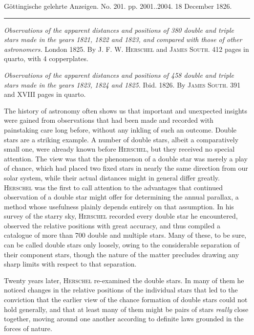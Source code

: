 \clearpage
{}
\hypertarget{native-647-lower}{}
\begin{center}\small Göttingische gelehrte Anzeigen. No. 201. pp. 2001..2004. 18 December 1826.\\[3pt]\rule{.72\linewidth}{.3pt}\end{center}

\emph{Observations of the apparent distances and positions of \textup{380} double and triple stars made in the years \textup{1821}, \textup{1822} and \textup{1823}, and compared with those of other astronomers.} London 1825. By \textsc{J. F. W. Herschel} and \textsc{James South}. 412 pages in quarto, with 4 copperplates.

\emph{Observations of the apparent distances and positions of \textup{458} double and triple stars made in the years \textup{1823}, \textup{1824} and \textup{1825}.} Ibid. 1826. By \textsc{James South}. 391 and XVIII pages in quarto.

The history of astronomy often shows us that important and unexpected insights were gained from observations that had been made and recorded with painstaking care long before, without any inkling of such an outcome. Double stars are a striking example. A number of double stars, albeit a comparatively small one, were already known before \textsc{Herschel}, but they received no special attention. The view was that the phenomenon of a double star was merely a play of chance, which had placed two fixed stars in nearly the same direction from our solar system, while their actual distances might in general differ greatly. \textsc{Herschel} was the first to call attention to the advantages that continued observation of a double star might offer for determining the annual parallax, a method whose usefulness plainly depends entirely on that assumption. In his survey of the starry sky, \textsc{Herschel} recorded every double star he encountered, observed the relative positions with great accuracy, and thus compiled a catalogue of more than 700 double and multiple stars. Many of these, to be sure, can be called double stars only loosely, owing to the considerable separation of their component stars, though the nature of the matter precludes drawing any sharp limits with respect to that separation.

Twenty years later, \textsc{Herschel} re-examined the double stars. In many of them he noticed changes in the relative positions of the individual stars that led to the conviction that the earlier view of the chance formation of double stars could not hold generally, and that at least many of them might be pairs of stars \emph{really} close together, moving around one another according to definite laws grounded in the forces of nature.

